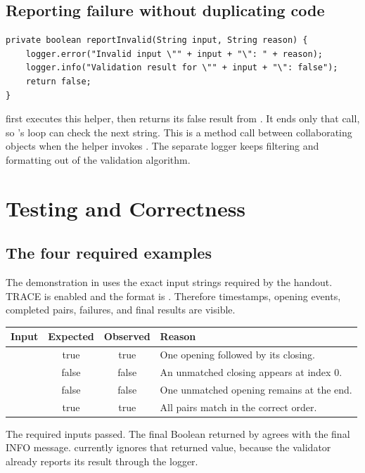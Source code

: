 \subsection{Reporting failure without duplicating code}
\begin{lstlisting}
private boolean reportInvalid(String input, String reason) {
    logger.error("Invalid input \"" + input + "\": " + reason);
    logger.info("Validation result for \"" + input + "\": false");
    return false;
}
\end{lstlisting}
 first executes this helper, then returns its false result from . It ends only that call, so 's loop can check the next string. This is a method call between collaborating objects when the helper invokes . The separate logger keeps filtering and formatting out of the validation algorithm.

\newpage
\section{Testing and Correctness}
\subsection{The four required examples}
The demonstration in  uses the exact input strings required by the handout. TRACE is enabled and the format is . Therefore timestamps, opening events, completed pairs, failures, and final results are visible.

\begin{tabularx}{\textwidth}{@{}p{39mm}ccY@{}}
\toprule
\textbf{Input} & \textbf{Expected} & \textbf{Observed} & \textbf{Reason}\\
\midrule
\code{()} & true & true & One opening followed by its closing.\\
\code{)((()))} & false & false & An unmatched closing appears at index 0.\\
\code{(} & false & false & One unmatched opening remains at the end.\\
\code{(())((()())())} & true & true & All pairs match in the correct order.\\
\bottomrule
\end{tabularx}

The required inputs passed. The final Boolean returned by  agrees with the final INFO message.  currently ignores that returned value, because the validator already reports its result through the logger.

